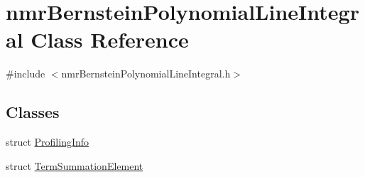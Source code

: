 \hypertarget{classnmr_bernstein_polynomial_line_integral}{\section{nmr\-Bernstein\-Polynomial\-Line\-Integral Class Reference}
\label{classnmr_bernstein_polynomial_line_integral}
}


{\ttfamily \#include $<$nmr\-Bernstein\-Polynomial\-Line\-Integral.\-h$>$}

\subsection*{Classes}
\begin{DoxyCompactItemize}
\item 
struct \hyperlink{structnmr_bernstein_polynomial_line_integral_1_1_profiling_info}{Profiling\-Info}
\item 
struct \hyperlink{structnmr_bernstein_polynomial_line_integral_1_1_term_summation_element}{Term\-Summation\-Element}
\end{DoxyCompactItemize}
